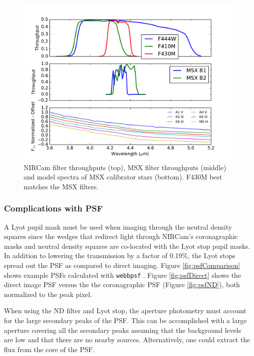 \documentclass{aastex6}
\begin{document}
\begin{figure}[!hbtp]
\centering
\includegraphics[width=.55\columnwidth]{msx_nircam_filt.pdf}
\caption{NIRCam filter throughputs (top), MSX filter throughputs \citep{egan1999msxGuide} (middle) and model spectra of MSX calibrator stars (bottom). F430M best matches the MSX filters.}\label{fig:msxNCfilterOverlap}
\end{figure}

\subsubsection{Complications with PSF}
A Lyot pupil mask must be used when imaging through the neutral density squares since the wedges that redirect light through NIRCam's coronagraphic masks and neutral density squares are co-located with the Lyot stop pupil masks.
In addition to lowering the transmission by a factor of 0.19\%, the Lyot stops spread out the PSF as compared to direct imaging.
Figure \ref{fig:psfComparison} shows example PSFs calculated with \texttt{webbpsf} \citep{perrin2012webbpsf}.
Figure \ref{fig:psfDirect} shows the direct image PSF versus the the coronagraphic PSF (Figure \ref{fig:psfND}), both normalized to the peak pixel.

When using the ND filter and Lyot stop, the aperture photometry must account for the large secondary peaks of the PSF.
This can be accomplished with a large aperture covering all the secondary peaks assuming that the background levels are low and that there are no nearby sources.
Alternatively, one could extract the flux from the core of the PSF.
\end{document}
